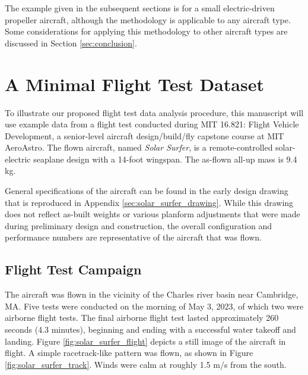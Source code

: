 \documentclass[conf]{new-aiaa}
\begin{document}
    The example given in the subsequent sections is for a small electric-driven propeller aircraft, although the methodology is applicable to any aircraft type. Some considerations for applying this methodology to other aircraft types are discussed in Section \ref{sec:conclusion}.

    \section{A Minimal Flight Test Dataset}

    To illustrate our proposed flight test data analysis procedure, this manuscript will use example data from a flight test conducted during MIT 16.821: Flight Vehicle Development, a senior-level aircraft design/build/fly capstone course at MIT AeroAstro. The flown aircraft, named \emph{Solar Surfer}, is a remote-controlled solar-electric seaplane design with a 14-foot wingspan. The as-flown all-up mass is 9.4 kg.

    General specifications of the aircraft can be found in the early design drawing that is reproduced in Appendix \ref{sec:solar_surfer_drawing}. While this drawing does not reflect as-built weights or various planform adjustments that were made during preliminary design and construction, the overall configuration and performance numbers are representative of the aircraft that was flown.

    \subsection{Flight Test Campaign}

    The aircraft was flown in the vicinity of the Charles river basin near Cambridge, MA. Five tests were conducted on the morning of May 3, 2023, of which two were airborne flight tests. The final airborne flight test lasted approximately 260 seconds (4.3 minutes), beginning and ending with a successful water takeoff and landing. Figure \ref{fig:solar_surfer_flight} depicts a still image of the aircraft in flight. A simple racetrack-like pattern was flown, as shown in Figure \ref{fig:solar_surfer_track}. Winds were calm at roughly 1.5 m/s from the south.
\end{document}
